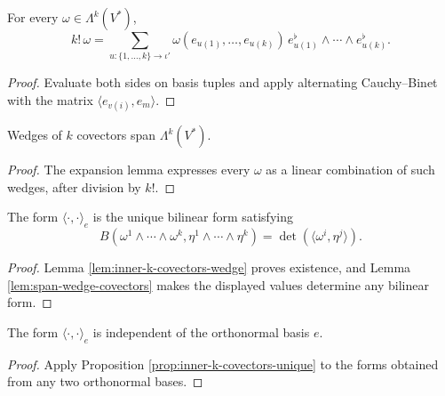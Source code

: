 \begin{lemma}
\label{lem:k-covector-wedge-expansion}
\leanok
{}
For every $\omega\in\Lambda^k(V^*)$,
\[
k!\,\omega=\sum_{u:\{1,\ldots,k\}\to\iota'}\omega(e_{u(1)},\ldots,e_{u(k)})\,e_{u(1)}^\flat\wedge\cdots\wedge e_{u(k)}^\flat.
\]
\end{lemma}
\begin{proof}
\leanok
{}
\sketch Evaluate both sides on basis tuples and apply alternating Cauchy--Binet with the matrix $\langle e_{v(i)},e_m\rangle$.
\end{proof}

\begin{lemma}
\label{lem:span-wedge-covectors}
\leanok
{}
Wedges of $k$ covectors span $\Lambda^k(V^*)$.
\end{lemma}
\begin{proof}
\leanok
{}
\sketch The expansion lemma expresses every $\omega$ as a linear combination of such wedges, after division by $k!$.
\end{proof}

\begin{proposition}
\label{prop:inner-k-covectors-unique}
\leanok
{}
The form $\langle\cdot,\cdot\rangle_e$ is the unique bilinear form satisfying
\[
B(\omega^1\wedge\cdots\wedge\omega^k,\eta^1\wedge\cdots\wedge\eta^k)=\det(\langle\omega^i,\eta^j\rangle).
\]
\end{proposition}
\begin{proof}
\leanok
{}
\sketch Lemma \ref{lem:inner-k-covectors-wedge} proves existence, and Lemma \ref{lem:span-wedge-covectors} makes the displayed values determine any bilinear form.
\end{proof}

\begin{proposition}
\label{prop:inner-k-covectors-frame-independent}
\leanok
{}
The form $\langle\cdot,\cdot\rangle_e$ is independent of the orthonormal basis $e$.
\end{proposition}
\begin{proof}
\leanok
{}
\sketch Apply Proposition \ref{prop:inner-k-covectors-unique} to the forms obtained from any two orthonormal bases.
\end{proof}

